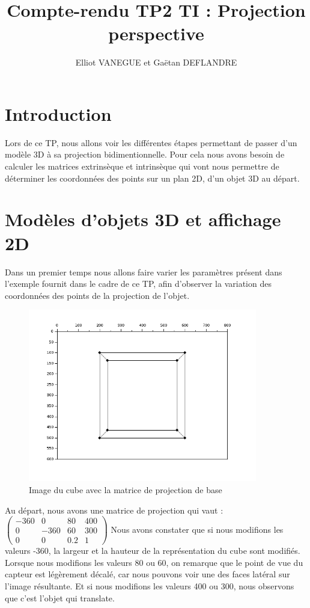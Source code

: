 \documentclass[a4paper,11pt]{article}
\title{Compte-rendu TP2 TI : Projection perspective}
\author{Elliot VANEGUE et Gaëtan DEFLANDRE}
\begin{document}


  \maketitle
  
  \mbox{}
  \newpage
  \clearpage
  
  \section*{Introduction}
  Lors de ce TP, nous allons voir les différentes étapes permettant de passer d'un
  modèle 3D à sa projection bidimentionnelle. Pour cela nous avons besoin de calculer les matrices 
  extrinsèque et intrinsèque qui vont nous permettre de déterminer les coordonnées des points
  sur un plan 2D, d'un objet 3D au départ.
  
  \section{Modèles d'objets 3D et affichage 2D}
  Dans un premier temps nous allons faire varier les paramètres présent dans l'exemple fournit
  dans le cadre de ce TP, afin d'observer la variation des coordonnées des points de la projection de l'objet.\\
  
  \begin{figure}[H]
    \center
    \includegraphics[width=10cm]{Projection1.png}
    \caption{Image du cube avec la matrice de projection de base}
  \end{figure}

  
  Au départ, nous avons une matrice de projection qui vaut : 
  $\begin{pmatrix}
   -360 & 0 & 80 & 400 \\
   0 & -360 & 60 & 300 \\
   0 & 0 & 0.2 & 1
  \end{pmatrix}$
  Nous avons constater que si nous modifions les valeurs -360, la largeur et la hauteur de la représentation du cube sont
  modifiés. 
  Lorsque nous modifions les valeurs 80 ou 60, on remarque que le point de vue du capteur est légèrement décalé, car nous 
  pouvons voir une des faces latéral sur l'image résultante.
  Et si nous modifions les valeurs 400 ou 300, nous observons que c'est l'objet qui translate.\\
  
\end{document}
